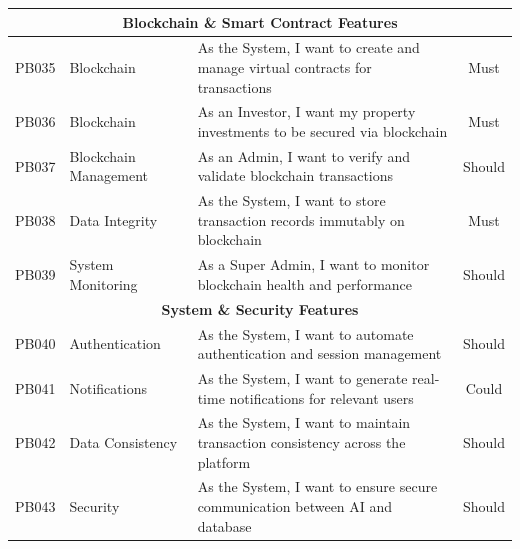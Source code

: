 \begin{longtable}{|c|l|p{8cm}|c|}
    \multicolumn{4}{|c|}{\cellcolor{primary!15}\textbf{\textcolor{primary}{Blockchain \& Smart Contract Features}}} \\
    \hline
    PB035 & Blockchain & As the System, I want to create and manage virtual contracts for transactions \cite{WangBlockchainRealEstate2023} & Must \\
    \hline
    PB036 & Blockchain & As an Investor, I want my property investments to be secured via blockchain \cite{McKinseyBlockchainRE2023} & Must \\
    \hline
    PB037 & Blockchain Management & As an Admin, I want to verify and validate blockchain transactions & Should \\
    \hline
    PB038 & Data Integrity & As the System, I want to store transaction records immutably on blockchain & Must \\
    \hline
    PB039 & System Monitoring & As a Super Admin, I want to monitor blockchain health and performance & Should \\
    \hline
    
    \multicolumn{4}{|c|}{\cellcolor{primary!15}\textbf{\textcolor{primary}{System \& Security Features}}} \\
    \hline
    PB040 & Authentication & As the System, I want to automate authentication and session management & Should \\
    \hline
    PB041 & Notifications & As the System, I want to generate real-time notifications for relevant users & Could \\
    \hline
    PB042 & Data Consistency & As the System, I want to maintain transaction consistency across the platform & Should \\
    \hline
    PB043 & Security & As the System, I want to ensure secure communication between AI and database & Should \\
    \hline
    

\end{longtable}
